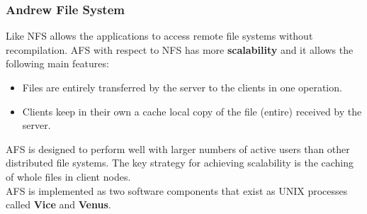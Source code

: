 \subsubsection{Andrew File System}
Like NFS allows the applications to access remote file systems without recompilation. AFS with respect to NFS has more \textbf{scalability} and it allows the following main features:
\begin{itemize}
	\item Files are entirely transferred by the server to the clients in one operation.
	\item Clients keep in their own a cache local copy of the file (entire) received by the server.
\end{itemize}
AFS is designed to perform well with larger numbers of active users than other distributed file systems. The key strategy for achieving scalability is the caching of whole files in client nodes.\\

AFS is implemented as two software components that exist as UNIX processes called \textbf{Vice} and \textbf{Venus}.

